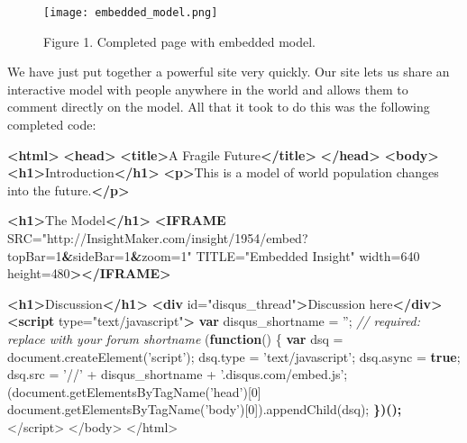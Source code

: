 \documentclass[]{memoir}
\makeatletter
\newenvironment{Shaded}{}{}
\newcommand{\KeywordTok}[1]{\textcolor[rgb]{0.00,0.44,0.13}{\textbf{{#1}}}}
\newcommand{\DecValTok}[1]{\textcolor[rgb]{0.25,0.63,0.44}{{#1}}}
\newcommand{\StringTok}[1]{\textcolor[rgb]{0.25,0.44,0.63}{{#1}}}
\newcommand{\CommentTok}[1]{\textcolor[rgb]{0.38,0.63,0.69}{\textit{{#1}}}}
\newcommand{\OtherTok}[1]{\textcolor[rgb]{0.00,0.44,0.13}{{#1}}}
\newcommand{\FunctionTok}[1]{\textcolor[rgb]{0.02,0.16,0.49}{{#1}}}
\newcommand{\ErrorTok}[1]{\textcolor[rgb]{1.00,0.00,0.00}{\textbf{{#1}}}}
\newcommand{\NormalTok}[1]{{#1}}
\def\maxwidth{\ifdim\Gin@nat@width>\linewidth\linewidth
\else\Gin@nat@width\fi}
\let\Oldincludegraphics\includegraphics
\renewcommand{\includegraphics}[1]{\Oldincludegraphics[width=\maxwidth]{#1}}
\makeatother
\begin{document}
\begin{figure}[htbp]
\centering
\texttt{[image: embedded\_model.png]}
\caption{Figure 1. Completed page with embedded model.}
\end{figure}

We have just put together a powerful site very quickly. Our site lets us
share an interactive model with people anywhere in the world and allows
them to comment directly on the model. All that it took to do this was
the following completed code:

\begin{Shaded}
\begin{Highlighting}[]
\KeywordTok{<html>}
\KeywordTok{<head>}
    \KeywordTok{<title>}\NormalTok{A Fragile Future}\KeywordTok{</title>}
\KeywordTok{</head>}
\KeywordTok{<body>}
    \KeywordTok{<h1>}\NormalTok{Introduction}\KeywordTok{</h1>}
        \KeywordTok{<p>}\NormalTok{This is a model of world population}
            \NormalTok{changes into the future.}\KeywordTok{</p>}
            
    \KeywordTok{<h1>}\NormalTok{The Model}\KeywordTok{</h1>}
        \KeywordTok{<IFRAME}\OtherTok{ SRC=}\StringTok{"http://InsightMaker.com/insight/1954/embed?topBar=1}\ErrorTok{&}\StringTok{sideBar=1}\ErrorTok{&}\StringTok{zoom=1"}
\OtherTok{        TITLE=}\StringTok{"Embedded Insight"}\OtherTok{ width=}\StringTok{640}\OtherTok{ height=}\StringTok{480}\KeywordTok{></IFRAME>}
        
    \KeywordTok{<h1>}\NormalTok{Discussion}\KeywordTok{</h1>}
        \KeywordTok{<div}\OtherTok{ id=}\StringTok{"disqus_thread"}\KeywordTok{>}\NormalTok{Discussion here}\KeywordTok{</div>}
        \KeywordTok{<script}\OtherTok{ type=}\StringTok{"text/javascript"}\KeywordTok{>}
            \KeywordTok{var} \NormalTok{disqus_shortname = }\StringTok{''}\NormalTok{; }\CommentTok{// required: replace with your forum shortname}
            \NormalTok{(}\KeywordTok{function}\NormalTok{() \{}
                \KeywordTok{var} \NormalTok{dsq = }\OtherTok{document}\NormalTok{.}\FunctionTok{createElement}\NormalTok{(}\StringTok{'script'}\NormalTok{); }\OtherTok{dsq}\NormalTok{.}\FunctionTok{type} \NormalTok{= }\StringTok{'text/javascript'}\NormalTok{; }\OtherTok{dsq}\NormalTok{.}\FunctionTok{async} \NormalTok{= }\KeywordTok{true}\NormalTok{;}
                \OtherTok{dsq}\NormalTok{.}\FunctionTok{src} \NormalTok{= }\StringTok{'//'} \NormalTok{+ disqus_shortname + }\StringTok{'.disqus.com/embed.js'}\NormalTok{;}
                \NormalTok{(}\OtherTok{document}\NormalTok{.}\FunctionTok{getElementsByTagName}\NormalTok{(}\StringTok{'head'}\NormalTok{)[}\DecValTok{0}\NormalTok{] \textbar{}\textbar{} }\OtherTok{document}\NormalTok{.}\FunctionTok{getElementsByTagName}\NormalTok{(}\StringTok{'body'}\NormalTok{)[}\DecValTok{0}\NormalTok{]).}\FunctionTok{appendChild}\NormalTok{(dsq);}
\ErrorTok{            \})();}
        \NormalTok{<}\OtherTok{/script>     }
\OtherTok{</body}\NormalTok{>}
\NormalTok{<}\OtherTok{/html>}
\end{Highlighting}
\end{Shaded}
\end{document}
